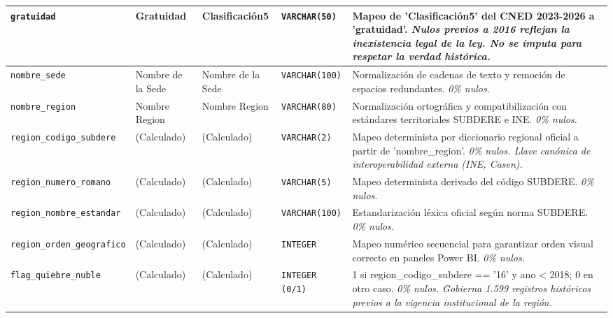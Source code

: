 {\begin{longtable}{|p{3.0cm}|p{2.0cm}|p{2.0cm}|p{1.6cm}|p{6.4cm}|}
\hline
\texttt{\footnotesize gratuidad} & Gratuidad & Clasificación5 & \texttt{\footnotesize VARCHAR(50)} & Mapeo de 'Clasificación5' del CNED 2023-2026 a 'gratuidad'. \newline \textit{\footnotesize Nulos previos a 2016 reflejan la inexistencia legal de la ley. No se imputa para respetar la verdad histórica.} \\
\hline
\texttt{\footnotesize nombre\_sede} & Nombre de la Sede & Nombre de la Sede & \texttt{\footnotesize VARCHAR(100)} & Normalización de cadenas de texto y remoción de espacios redundantes. \newline \textit{\footnotesize 0\% nulos.} \\
\hline
\texttt{\footnotesize nombre\_region} & Nombre Region & Nombre Region & \texttt{\footnotesize VARCHAR(80)} & Normalización ortográfica y compatibilización con estándares territoriales SUBDERE e INE. \newline \textit{\footnotesize 0\% nulos.} \\
\hline
\texttt{\footnotesize region\_codigo\_subdere} & (Calculado) & (Calculado) & \texttt{\footnotesize VARCHAR(2)} & Mapeo determinista por diccionario regional oficial a partir de 'nombre\_region'. \newline \textit{\footnotesize 0\% nulos. Llave canónica de interoperabilidad externa (INE, Casen).} \\
\hline
\texttt{\footnotesize region\_numero\_romano} & (Calculado) & (Calculado) & \texttt{\footnotesize VARCHAR(5)} & Mapeo determinista derivado del código SUBDERE. \newline \textit{\footnotesize 0\% nulos.} \\
\hline
\texttt{\footnotesize region\_nombre\_estandar} & (Calculado) & (Calculado) & \texttt{\footnotesize VARCHAR(100)} & Estandarización léxica oficial según norma SUBDERE. \newline \textit{\footnotesize 0\% nulos.} \\
\hline
\texttt{\footnotesize region\_orden\_geografico} & (Calculado) & (Calculado) & \texttt{\footnotesize INTEGER} & Mapeo numérico secuencial para garantizar orden visual correcto en paneles Power BI. \newline \textit{\footnotesize 0\% nulos.} \\
\hline
\texttt{\footnotesize flag\_quiebre\_nuble} & (Calculado) & (Calculado) & \texttt{\footnotesize INTEGER (0/1)} & 1 si region\_codigo\_subdere == '16' y ano < 2018; 0 en otro caso. \newline \textit{\footnotesize 0\% nulos. Gobierna 1.599 registros históricos previos a la vigencia institucional de la región.} \\

\end{longtable}}
